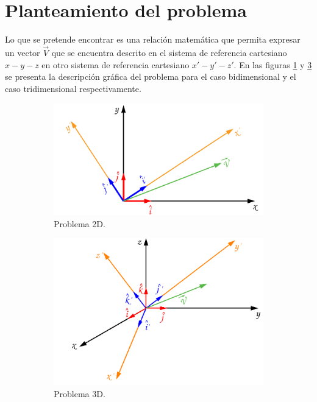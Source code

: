 \documentclass[12pt,letterpaper]{article}
\begin{document}
\section{Planteamiento del problema}
%
Lo que se pretende encontrar es una relación matemática que permita  expresar un vector  $\overset{\rightarrow}{V}$ que se encuentra descrito en el sistema de referencia cartesiano $x-y-z$ en otro sistema de referencia cartesiano $x'-y'-z'$. En las figuras \ref{planteamiento} y \ref{planteamiento3d} se presenta la descripción gráfica del problema para el caso bidimensional y el caso tridimensional respectivamente.  
%
\begin{figure}[H]
%	
	\centering
	\begin{subfigure}[l]{0.450\textwidth}
		\includegraphics[width=\textwidth]{img/Planteamiento.pdf}
		\caption{Problema 2D.}
		\label{planteamiento}
	\end{subfigure}
	\hspace{.5 cm}
	\begin{subfigure}[r]{0.450\textwidth}
		\includegraphics[width=\textwidth]{img/Planteamiento3D.pdf}
		\caption{Problema 3D.}
		\label{planteamiento3d}
	\end{subfigure}	
	\caption{}
\end{figure}
%
%
\end{document}
